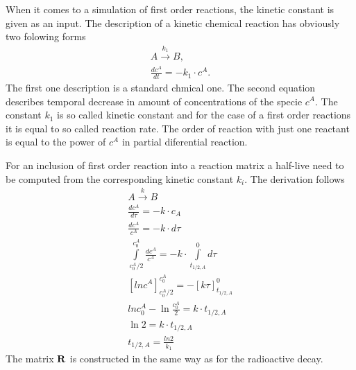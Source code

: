 When it comes to a simulation of first order reactions, the kinetic constant is given as an input. 
The description of a kinetic chemical reaction has obviously two folowing forms
\[
  \begin{array}{l}
    A\xrightarrow{k_1}B,\\
    \frac{dc^A}{dt} = -k_1 \cdot c^A.
  \end{array}
\]
The first one description is a standard chmical one. The second equation describes temporal decrease in amount of concentrations of the specie $c^A$. The constant $k_1$ is so called kinetic constant and for the case of a first order reactions it is equal to so called reaction rate. The order of reaction with just one reactant is equal to the power of $c^A$ in partial diferential reaction.

For an inclusion of first order reaction into a reaction matrix a half-live need to be computed from the corresponding kinetic constant $k_i$. The derivation follows
\[
  \begin{array}{l}
    A\xrightarrow{k} B\\
    \frac{dc^A}{d\tau} = -k\cdot c_A\\
    \frac{dc^A}{c^A} = -k\cdot d\tau\\
    \int\limits_{c^A_0/2}^{c^A_0}\frac{dc^A}{c^A} = -k\cdot\int\limits_{t_{1/2,A}}^{0} d\tau\\
    \left[ ln c^A\right]_{c^A_0/2}^{c^A_0} = -[k\tau]_{t_{1/2,A}}^{0}\\
    ln c^A_0 - \ln\frac{c^A_0}{2} = k\cdot t_{1/2,A}\\
    \ln 2 = k \cdot t_{1/2,A}\\
    t_{1/2,A} = \frac{ln 2}{k_1}
  \end{array}                                                                                                                                                                                                                                                                                                            
\]
The matrix ${\bf R}$ is constructed in the same way as for the radioactive
decay.

